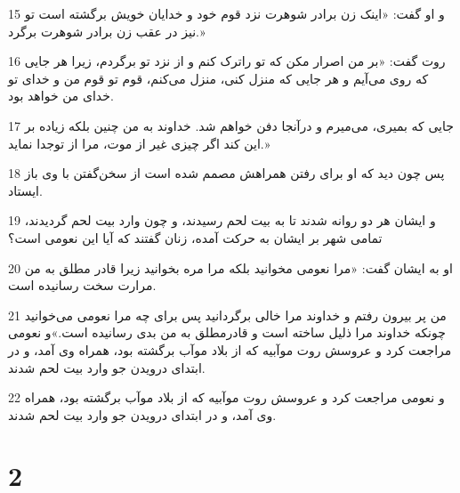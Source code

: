 \par 15 و او گفت: «اینک زن برادر شوهرت نزد قوم خود و خدایان خویش برگشته است تو نیز در عقب زن برادر شوهرت برگرد.»
\par 16 روت گفت: «بر من اصرار مکن که تو راترک کنم و از نزد تو برگردم، زیرا هر جایی که روی می‌آیم و هر جایی که منزل کنی، منزل می‌کنم، قوم تو قوم من و خدای تو خدای من خواهد بود.
\par 17 جایی که بمیری، می‌میرم و درآنجا دفن خواهم شد. خداوند به من چنین بلکه زیاده بر این کند اگر چیزی غیر از موت، مرا از توجدا نماید.»
\par 18 پس چون دید که او برای رفتن همراهش مصمم شده است از سخن‌گفتن با وی باز ایستاد.
\par 19 و ایشان هر دو روانه شدند تا به بیت لحم رسیدند، و چون وارد بیت لحم گردیدند، تمامی شهر بر ایشان به حرکت آمده، زنان گفتند که آیا این نعومی است؟
\par 20 او به ایشان گفت: «مرا نعومی مخوانید بلکه مرا مره بخوانید زیرا قادر مطلق به من مرارت سخت رسانیده است.
\par 21 من پر بیرون رفتم و خداوند مرا خالی برگردانید پس برای چه مرا نعومی می‌خوانید چونکه خداوند مرا ذلیل ساخته است و قادرمطلق به من بدی رسانیده است.»و نعومی مراجعت کرد و عروسش روت موآبیه که از بلاد موآب برگشته بود، همراه وی آمد، و در ابتدای درویدن جو وارد بیت لحم شدند.
\par 22 و نعومی مراجعت کرد و عروسش روت موآبیه که از بلاد موآب برگشته بود، همراه وی آمد، و در ابتدای درویدن جو وارد بیت لحم شدند.
 
\chapter{2}

